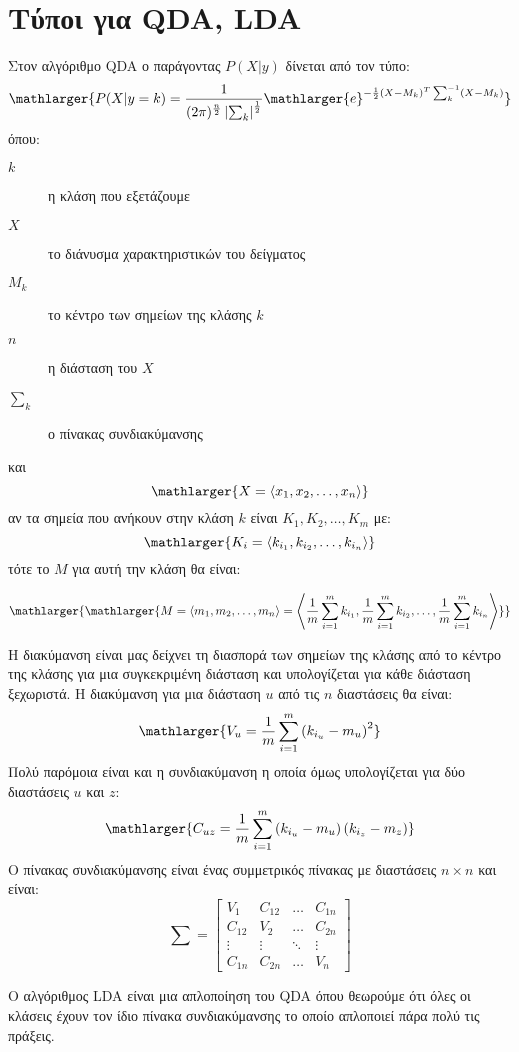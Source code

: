 \newpage
\section{Τύποι για \textlatin{QDA, LDA}}
\label{app:app1}
Στον αλγόριθμο \textlatin{QDA} ο παράγοντας $P(X|y)$ δίνεται από τον τύπο:
$$\mathlarger{P(X|y=k)=\frac{1}{(2\pi)^\frac{n}{2}\left\lvert \sum_k\right\rvert^\frac{1}{2}}\mathlarger{e}^{-\frac{1}{2}(X-M_k)^T\sum_k^{-1}(X-M_k)}}$$
όπου:
\begin{description}
    \item[$k$] η κλάση που εξετάζουμε
    \item[$X$] το διάνυσμα χαρακτηριστικών του δείγματος
    \item[$M_k$] το κέντρο των σημείων της κλάσης $k$
    \item[$n$] η διάσταση του $X$
    \item[$\sum_k$] ο πίνακας συνδιακύμανσης
\end{description}
και
$$\mathlarger{X=\left\langle x_1,x_2,\dots,x_n\right\rangle}$$
αν τα σημεία που ανήκουν στην κλάση $k$ είναι $K_1,K_2,\dots,K_m$ με:
$$\mathlarger{K_i=\left\langle k_{i_1},k_{i_2},\dots,k_{i_n}\right\rangle}$$
τότε το $M$ για αυτή την κλάση θα είναι:
\begin{changemargin}{-2cm}{-2cm}
    $$\mathlarger{\mathlarger{M=\left\langle m_1,m_2,\dots,m_n\right\rangle =\left\langle \frac{1}{m}\sum\limits_{i=1}^{m}k_{i_1},\frac{1}{m}\sum\limits_{i=1}^{m}k_{i_2},\dots,\frac{1}{m}\sum\limits_{i=1}^{m}k_{i_n}\right\rangle}}$$
\end{changemargin}
Η διακύμανση είναι μας δείχνει τη διασπορά των σημείων της κλάσης από το κέντρο
της κλάσης για μια συγκεκριμένη διάσταση και υπολογίζεται για κάθε διάσταση
ξεχωριστά. Η διακύμανση για μια διάσταση $u$ από τις $n$ διαστάσεις θα είναι:
$$\mathlarger{V_u=\frac{1}{m}\sum\limits_{i=1}^{m}\left(k_{i_u}-m_u\right)^2}$$
Πολύ παρόμοια είναι και η συνδιακύμανση η οποία όμως υπολογίζεται για δύο
διαστάσεις $u$ και $z$:
$$\mathlarger{C_{uz}=\frac{1}{m}\sum\limits_{i=1}^{m}\left(k_{i_u}-m_u\right)\left(k_{i_z}-m_z\right)}$$
Ο πίνακας συνδιακύμανσης είναι ένας συμμετρικός πίνακας με διαστάσεις
$n\times n$ και είναι:
$$
\sum =
\begin{bmatrix}
    V_1 & C_{12} & \dots & C_{1n} \\
    C_{12} & V_2 & \dots & C_{2n} \\
    \vdots & \vdots & \ddots & \vdots \\
    C_{1n} & C_{2n} & \dots & V_n
\end{bmatrix}
$$

Ο αλγόριθμος \textlatin{LDA} είναι μια απλοποίηση του \textlatin{QDA} όπου
θεωρούμε ότι όλες οι κλάσεις έχουν τον ίδιο πίνακα συνδιακύμανσης το οποίο
απλοποιεί πάρα πολύ τις πράξεις.